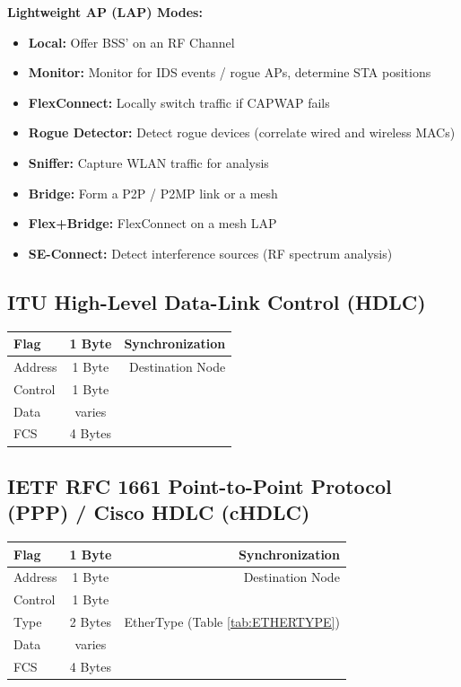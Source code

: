 \documentclass[12pt]{article}
\begin{document}
	\noindent\textbf{Lightweight AP (LAP) Modes:}
	\begin{itemize}
		\label{itm:LIGHTWEIGHT AP}
		\item{\textbf{Local:} Offer BSS' on an RF Channel}
		\item{\textbf{Monitor:} Monitor for IDS events / rogue APs, determine STA positions}
		\item{\textbf{FlexConnect:} Locally switch traffic if CAPWAP fails}
		\item{\textbf{Rogue Detector:} Detect rogue devices (correlate wired and wireless MACs)}
		\item{\textbf{Sniffer:} Capture WLAN traffic for analysis}
		\item{\textbf{Bridge:} Form a P2P / P2MP link or a mesh}
		\item{\textbf{Flex+Bridge:} FlexConnect on a mesh LAP}
		\item{\textbf{SE-Connect:} Detect interference sources (RF spectrum analysis)}
	\end{itemize}


	\subsection{ITU High-Level Data-Link Control (HDLC) \label{subsec:ITU HDLC}}
	\begin{table}[H]
	\centering
	\begin{tabular}{| l | c | r |}
	\hline
	Flag		& 1 Byte	& Synchronization\\\hline
	Address	& 1 Byte	& Destination Node\\\hline
	Control	& 1 Byte	&\\\hline
	Data		& varies	&\\\hline
	FCS		& 4 Bytes	&\\\hline
	\end{tabular}\end{table}


	\subsection{IETF RFC 1661 Point-to-Point Protocol (PPP) / Cisco HDLC (cHDLC) \label{subsec:IETF PPP}}
	\begin{table}[H]
	\centering
	\begin{tabular}{| l | c | r |}
	\hline
	Flag		& 1 Byte	& Synchronization\\\hline
	Address	& 1 Byte	& Destination Node\\\hline
	Control	& 1 Byte	&\\\hline
	Type		& 2 Bytes	& EtherType (Table \ref{tab:ETHERTYPE})\\\hline
	Data		& varies	&\\\hline
	FCS		& 4 Bytes	&\\\hline
	\end{tabular}\end{table}
\end{document}
